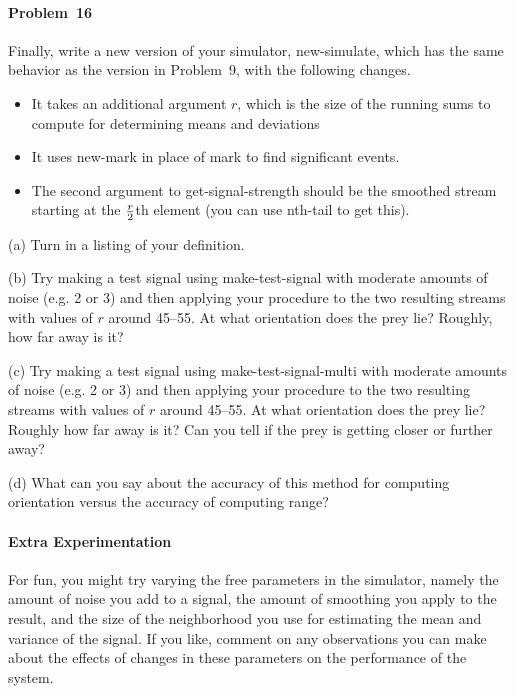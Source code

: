 \paragraph{Problem~16}  Finally, write a new version of your simulator, {\cf
new-simulate}, which has the same behavior as the version in Problem~9, with
the following changes.

\begin{itemize}

\item It takes an additional argument $r$, which is the size of the running
      sums to compute for determining means and deviations

\item It uses {\cf new-mark} in place of {\cf mark} to find significant
      events.

\item The second argument to {\cf get-signal-strength} should be the
      smoothed stream starting at the ${r \over 2}$th element (you can use
      {\cf nth-tail} to get this).

\end{itemize}


(a) Turn in a listing of your definition.

(b) Try making a test signal using {\cf make-test-signal} with moderate
amounts of noise (e.g. 2 or 3)  and 
then applying your procedure to the
two resulting streams with values of $r$ around 45--55.  At what
orientation does the prey lie?   Roughly, how far away is it?

(c) Try making a test signal using {\cf make-test-signal-multi} with moderate
amounts of noise (e.g. 2 or 3) and 
then applying your procedure to the
two resulting streams with values of $r$ around 45--55.  At what
orientation does the prey lie?   Roughly how far away is it?
Can you tell if the prey is getting closer or further away?

(d) What can you say about the accuracy of this method for computing
orientation versus the accuracy of computing range?


\paragraph{Extra Experimentation}  For fun, you might try varying the free
parameters in the simulator, namely the amount of noise you add to a
signal, the amount of smoothing you apply to the result, and the size of
the neighborhood you use for estimating the mean and variance of the
signal.  If you like, comment on any observations you can make
about the effects of changes in these parameters on the performance
of the system.



